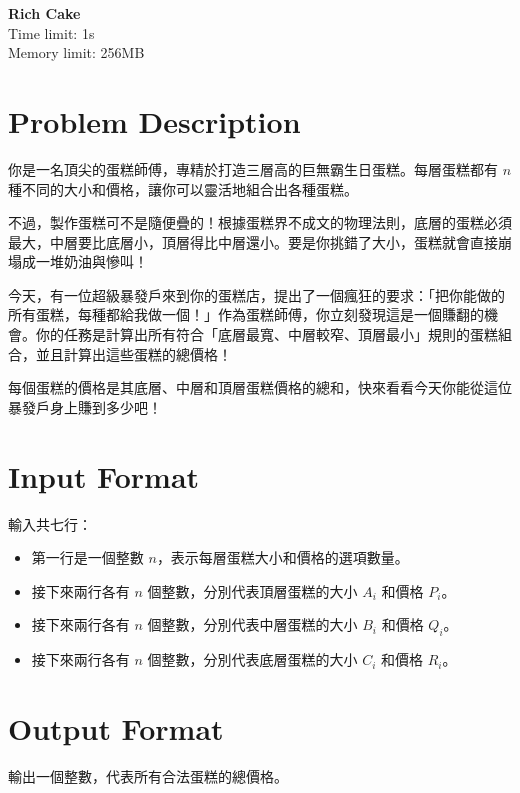 \documentclass[12pt, a4paper]{article}
\begin{document}
\begin{center}
    \parbox{0.8\textwidth}{
        \centering
        \vspace{0.5em}
        \LARGE \textbf{Rich Cake}\\[0.5em]
        \large{Time limit: 1s}\\
        \large{Memory limit: 256MB}\\[0.8em]
    }
\end{center}
\thispagestyle{fancy}

\section*{Problem Description}
你是一名頂尖的蛋糕師傅，專精於打造三層高的巨無霸生日蛋糕。每層蛋糕都有 $n$ 種不同的大小和價格，讓你可以靈活地組合出各種蛋糕。

不過，製作蛋糕可不是隨便疊的！根據蛋糕界不成文的物理法則，底層的蛋糕必須最大，中層要比底層小，頂層得比中層還小。要是你挑錯了大小，蛋糕就會直接崩塌成一堆奶油與慘叫！

今天，有一位超級暴發戶來到你的蛋糕店，提出了一個瘋狂的要求：「把你能做的所有蛋糕，每種都給我做一個！」作為蛋糕師傅，你立刻發現這是一個賺翻的機會。你的任務是計算出所有符合「底層最寬、中層較窄、頂層最小」規則的蛋糕組合，並且計算出這些蛋糕的總價格！

每個蛋糕的價格是其底層、中層和頂層蛋糕價格的總和，快來看看今天你能從這位暴發戶身上賺到多少吧！

\section*{Input Format}
輸入共七行：
\begin{itemize}
    \item 第一行是一個整數 $n$，表示每層蛋糕大小和價格的選項數量。
    \item 接下來兩行各有 $n$ 個整數，分別代表頂層蛋糕的大小 $A_i$ 和價格 $P_i$。
    \item 接下來兩行各有 $n$ 個整數，分別代表中層蛋糕的大小 $B_i$ 和價格 $Q_i$。
    \item 接下來兩行各有 $n$ 個整數，分別代表底層蛋糕的大小 $C_i$ 和價格 $R_i$。
\end{itemize}

\section*{Output Format}
輸出一個整數，代表所有合法蛋糕的總價格。
\end{document}
